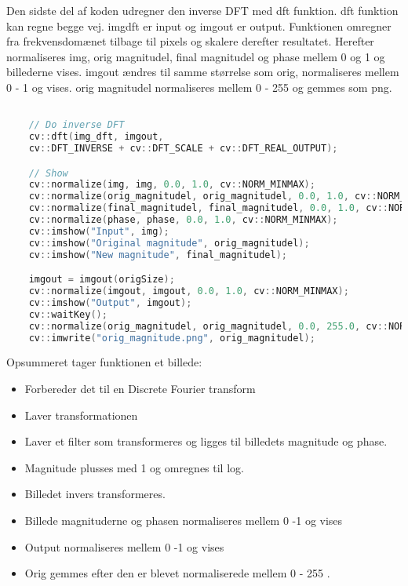 \documentclass{article}
\begin{document}
Den sidste del af koden udregner den inverse DFT med dft funktion. dft funktion kan regne begge vej. imgdft er input og imgout er output. Funktionen omregner fra frekvensdomænet tilbage til pixels og skalere derefter resultatet. \newline 
Herefter normaliseres img, orig magnitudel, final magnitudel og phase mellem 0 og 1 og billederne vises. \newline 
imgout ændres til samme størrelse som orig, normaliseres mellem 0 - 1 og vises. orig magnitudel normaliseres mellem 0 - 255 og gemmes som png.\newline 

\begin{lstlisting}[language=c++] 

    // Do inverse DFT 
    cv::dft(img_dft, imgout, 
    cv::DFT_INVERSE + cv::DFT_SCALE + cv::DFT_REAL_OUTPUT); 

    // Show 
    cv::normalize(img, img, 0.0, 1.0, cv::NORM_MINMAX); 
    cv::normalize(orig_magnitudel, orig_magnitudel, 0.0, 1.0, cv::NORM_MINMAX); 
    cv::normalize(final_magnitudel, final_magnitudel, 0.0, 1.0, cv::NORM_MINMAX); 
    cv::normalize(phase, phase, 0.0, 1.0, cv::NORM_MINMAX); 
    cv::imshow("Input", img); 
    cv::imshow("Original magnitude", orig_magnitudel); 
    cv::imshow("New magnitude", final_magnitudel); 

    imgout = imgout(origSize); 
    cv::normalize(imgout, imgout, 0.0, 1.0, cv::NORM_MINMAX); 
    cv::imshow("Output", imgout); 
    cv::waitKey(); 
    cv::normalize(orig_magnitudel, orig_magnitudel, 0.0, 255.0, cv::NORM_MINMAX); 
    cv::imwrite("orig_magnitude.png", orig_magnitudel); 
\end{lstlisting} 

Opsummeret tager funktionen et billede: 

\begin{itemize} 
    \item Forbereder det til en Discrete Fourier transform  
    \item Laver transformationen 
    \item Laver et filter som transformeres og ligges til billedets magnitude og phase.  
    \item Magnitude plusses med 1 og omregnes til log.  
    \item Billedet invers transformeres.  
    \item Billede magnituderne og phasen normaliseres mellem 0 -1  og vises 
    \item Output normaliseres mellem 0 -1 og vises   
    \item Orig gemmes efter den er blevet normaliserede mellem 0 - 255 . 
\end{itemize} 
\end{document}
